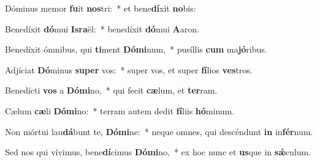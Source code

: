 \item Dóminus memor \textbf{fu}it \textbf{nos}tri:~* et bene\textbf{dí}xit \textbf{no}bis:
\item Benedíxit \textbf{dó}mui \textbf{Is}\textbf{ra}ël:~* benedíxit \textbf{dó}mui \textbf{A}aron.
\item Benedíxit ómnibus, qui \textbf{ti}ment \textbf{Dó}\textbf{mi}num,~* pusíllis \textbf{cum} ma\textbf{jó}ribus.
\item Adjíciat \textbf{Dó}minus \textbf{su}\textbf{per} vos:~* super vos, et super \textbf{fí}lios \textbf{ves}tros.
\item Benedícti \textbf{vos} a \textbf{Dó}\textbf{mi}no,~* qui fecit \textbf{cæ}lum, et \textbf{ter}ram.
\item Cælum \textbf{cæ}li \textbf{Dó}\textbf{mi}no:~* terram autem dedit \textbf{fí}liis \textbf{hó}minum.
\item Non mórtui lau\textbf{dá}bunt te, \textbf{Dó}\textbf{mi}ne:~* neque omnes, qui descéndunt \textbf{in} in\textbf{fér}num.
\item Sed nos qui vívimus, bene\textbf{dí}cimus \textbf{Dó}\textbf{mi}no,~* ex hoc nunc et \textbf{us}que in \textbf{sǽ}culum.
